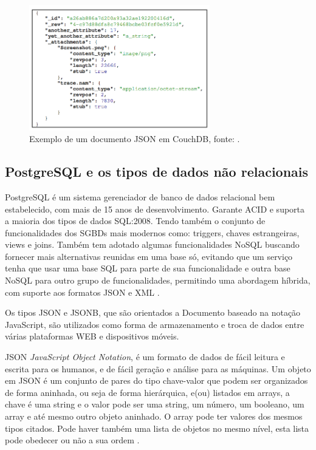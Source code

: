\documentclass[article,11pt,oneside,a4paper]{abntex2} %
\begin{document}
	\begin{figure}[!htb]
		\centering
		\includegraphics[width=0.7\textwidth]{figuras/doc}
		\caption{Exemplo de um documento JSON em CouchDB, fonte: \cite{weber}.}
		\label{couch}
	\end{figure}
	
	\subsection{PostgreSQL e os tipos de dados não relacionais} \label{postgresql_sub_sec}
		\hspace{13pt}
	PostgreSQL é um sistema gerenciador de banco de dados relacional bem estabelecido, com mais de 15 anos de desenvolvimento. Garante ACID e suporta a maioria dos tipos de dados SQL:2008. Tendo também o conjunto de funcionalidades dos SGBDs mais modernos como: triggers, chaves estrangeiras, views e joins. Também tem adotado algumas funcionalidades NoSQL buscando fornecer mais alternativas reunidas em uma base só, evitando que um serviço tenha que usar uma base SQL para parte de sua funcionalidade e outra base NoSQL para outro grupo de funcionalidades, permitindo uma abordagem híbrida, com suporte aos formatos JSON e XML \cite{postgresql}.
	
	Os tipos JSON e JSONB, que são orientados a Documento baseado na notação JavaScript, são utilizados como forma de armazenamento e troca de dados entre várias plataformas WEB e dispositivos móveis.
	
	JSON \textit{JavaScript Object Notation}, é um formato de dados de fácil leitura e escrita para os humanos, e de fácil geração e análise para as máquinas. Um objeto em JSON é um conjunto de pares do tipo chave-valor que podem ser organizados de forma aninhada, ou seja de forma hierárquica, e(ou) listados em arrays, a chave é uma string e o valor pode ser uma string, um número, um booleano, um array e até mesmo outro objeto aninhado. O array pode ter valores dos mesmos tipos citados. Pode haver também uma lista de objetos no mesmo nível, esta lista pode obedecer ou não a sua ordem \cite{json}.
	
\end{document}
